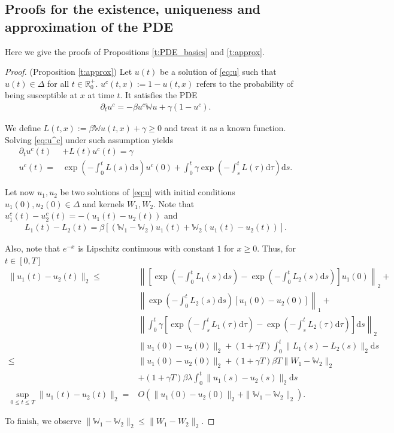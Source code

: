 \documentclass{article}
\renewcommand{\d}{\mathrm{d}}
\newcommand{\W}{\mathbb{W}}
\newcommand{\1}[1]{{\mathds{1}}_{\left\{#1\right\}}}
\begin{document}
\subsection{Proofs for the  existence, uniqueness and approximation of the PDE}
\label{s:PDE_proofs}

Here we give the proofs of Propositions \ref{t:PDE_basics} and \ref{t:approx}.

\begin{proof}(Proposition \ref{t:approx})
		Let $u(t)$ be a solution of \eqref{eq:u} such that $u(t) \in \Delta$ for all $t \in \mathbb{R}_{0}^{+}$. $u^c(t,x):=1-u(t,x)$ refers to the probability of being susceptible at $x$ at time $t$. It satisfies the PDE
		\begin{align}
			\label{eq:u^c}
			\partial_t u^c=-\beta u^c \W u+\gamma(1-u^c).
		\end{align}
		
		We define $L(t,x):=\beta \W u(t,x)+\gamma \geq 0$ and treat it as a known function. Solving \eqref{eq:u^c} under such assumption yields
		\begin{align}
			\nonumber
			\partial_t u^c(t)&+L(t)u^c(t)=\gamma \\
			\label{eq:u^c_explicit}
			u^c(t)=& \exp\left(-\int_{0}^{t}L(s) \d s\right)u^c(0)+\int_{0}^{t} \gamma \exp \left(-\int_{s}^{t}L(\tau) \d \tau \right) \d s.
		\end{align}
		
		Let now $u_1,u_2$ be two solutions of \eqref{eq:u} with initial conditions $u_1(0),u_2(0) \in \Delta$ and kernels $W_1,W_2$. Note that $u_1^c(t)-u_2^c(t)=-(u_1(t)-u_2(t))$ and 
		\begin{align}
		\label{eq:L_difference}
		L_1(t)-L_2(t)=\beta \left[\left(\W_1-\W_2\right)u_1(t)+\W_2\left(u_1(t)-u_2(t)\right) \right].
		\end{align}
	
		Also, note that $e^{-x}$ is Lipschitz continuous with constant $1$ for $x \geq 0$.  
		Thus, for $t \in [0,T]$ 
		\begin{align*}
			\|u_1(t)-u_2(t) \|_2 \leq& \left \| \left[\exp\left(-\int_{0}^{t}L_1(s) \d s\right)-\exp\left(-\int_{0}^{t}L_2(s) \d s\right) \right] u_1(0) \right \|_2 + \\
			&\left \|\exp\left(-\int_{0}^{t}L_2(s) \d s\right)[u_1(0)-u_2(0)] \right \|_1+\\
			& \left \|\int_{0}^{t} \gamma  \left[\exp \left(-\int_{s}^{t}L_1(\tau) \d \tau \right)-\exp \left(-\int_{s}^{t}L_2(\tau) \d \tau \right) \right] \d s \right \|_2 \\
			&\|u_1(0)-u_2(0) \|_2+(1+\gamma T)\int_{0}^{t} \|L_1(s)-L_2(s) \|_2 \d s \\
			\leq & \|u_1(0)-u_2(0) \|_2+(1+\gamma T)\beta T \|W_1 -\W_2\|_2\\
			&+(1+\gamma T)\beta \lambda\int_{0}^{t} \|u_1(s)-u_2(s) \|_2 \d s\\
			\sup_{0\leq t \leq T}\|u_1(t)-u_2(t) \|_2=& O\left(\|u_1(0)-u_2(0) \|_2+\|\W_1-\W_2 \|_2 \right).
		\end{align*}
	
	To finish, we observe $\|\W_1-\W_2 \|_2 \leq \|W_1-W_2 \|_2.$		 
\end{proof}
\end{document}
